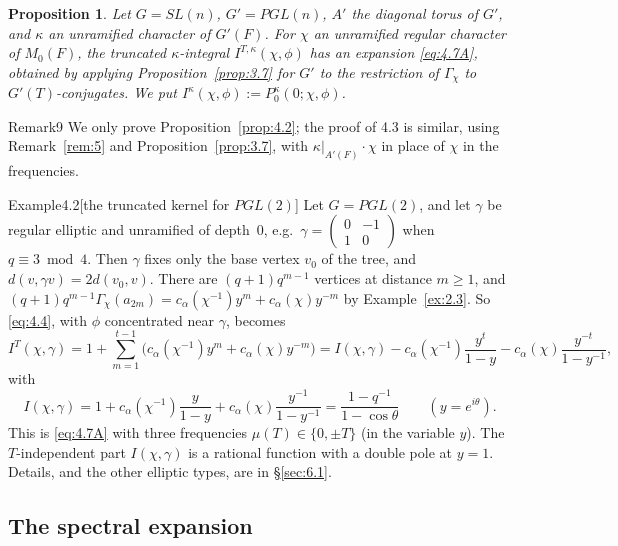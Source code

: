 \documentclass[12pt,letterpaper]{article}
\numberwithin{equation}{section}
\theoremstyle{plain}
\newtheorem{proposition}[lemma]{Proposition}
\theoremstyle{remark}
\theoremstyle{plain}
\theoremstyle{definition}
\theoremstyle{remark}
\theoremstyle{remark}
\begin{document}
\begin{proposition}\label{prop:4.3}
Let $G=SL(n)$, $G'=PGL(n)$, $A'$ the diagonal torus of $G'$, and $\kappa$ an unramified character of $G'(F)$. For $\chi$ an unramified regular character of $M_0(F)$, the truncated $\kappa$-integral $I^{T,\kappa}(\chi,\phi)$ has an expansion \eqref{eq:4.7A}, obtained by applying Proposition~\ref{prop:3.7} for $G'$ to the restriction of $\Gamma_\chi$ to $G'(T)$-conjugates. We put $I^\kappa(\chi,\phi):=P^\kappa_0(0;\chi,\phi)$.
\end{proposition}

\begin{fixedrem}{Remark}{9}\label{rem:9}
We only prove Proposition~\ref{prop:4.2}; the proof of 4.3 is similar, using Remark~\ref{rem:5} and Proposition~\ref{prop:3.7}, with $\kappa|_{A'(F)}\cdot\chi$ in place of $\chi$ in the frequencies.
\end{fixedrem}

\begin{fixedrem}{Example}{4.2}[the truncated kernel for $PGL(2)$]\label{ex:4.2}
Let $G=PGL(2)$, and let $\gamma$ be regular elliptic and unramified of depth~$0$, e.g.\ $\gamma=\left(\begin{smallmatrix}0&-1\\1&0\end{smallmatrix}\right)$ when $q\equiv3\bmod4$. Then $\gamma$ fixes only the base vertex $v_0$ of the tree, and $d(v,\gamma v)=2d(v_0,v)$. There are $(q+1)q^{m-1}$ vertices at distance $m\ge1$, and $(q+1)q^{m-1}\Gamma_\chi(a_{2m})=c_\alpha(\chi^{-1})y^m+c_\alpha(\chi)y^{-m}$ by Example~\ref{ex:2.3}. So \eqref{eq:4.4}, with $\phi$ concentrated near $\gamma$, becomes
\[
I^T(\chi,\gamma)=1+\sum_{m=1}^{t-1}\big(c_\alpha(\chi^{-1})y^m+c_\alpha(\chi)y^{-m}\big)
=I(\chi,\gamma)-c_\alpha(\chi^{-1})\frac{y^t}{1-y}-c_\alpha(\chi)\frac{y^{-t}}{1-y^{-1}},
\]
with
\[
I(\chi,\gamma)=1+c_\alpha(\chi^{-1})\frac{y}{1-y}+c_\alpha(\chi)\frac{y^{-1}}{1-y^{-1}}=\frac{1-q^{-1}}{1-\cos\theta}\qquad(y=e^{i\theta}).
\]
This is \eqref{eq:4.7A} with three frequencies $\mu(T)\in\{0,\pm T\}$ (in the variable $y$). The $T$-independent part $I(\chi,\gamma)$ is a rational function with a double pole at $y=1$. Details, and the other elliptic types, are in \S\ref{sec:6.1}.
\end{fixedrem}

\subsection{The spectral expansion}\label{sec:4.3}
\end{document}
